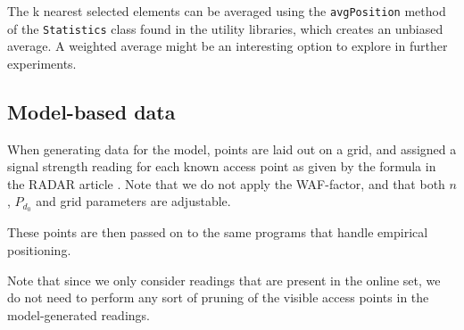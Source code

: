 The k nearest selected elements can be averaged using the \texttt{avgPosition} method of the \texttt{Statistics} class found in the utility libraries, which creates an unbiased average.
A weighted average might be an interesting option to explore in further experiments.

\subsection{Model-based data}

When generating data for the model, points are laid out on a grid, and assigned a signal strength reading for each known access point as given by the formula in the RADAR article  \citep{RADAR}. Note that we do not apply the WAF-factor, and that both $n$, $P_{d_0}$ and grid parameters are adjustable.

These points are then passed on to the same programs that handle empirical positioning.

Note that since we only consider readings that are present in the online set, we do not need to perform any sort of pruning of the visible access points in the model-generated readings. 
